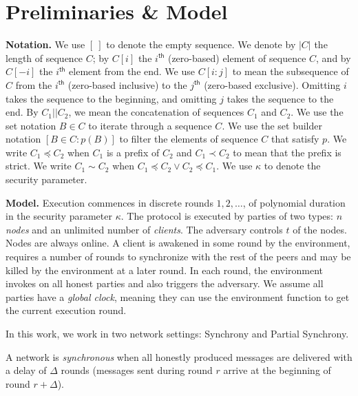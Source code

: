 \section{Preliminaries \& Model}\label{sec:prelims}

\noindent
\textbf{Notation.}
We use $[~]$ to denote the empty sequence.
We denote by $|C|$ the length of sequence $C$;
by $C[i]$ the $i^{\textsf{th}}$ (zero-based) element of
sequence $C$, and by $C[-i]$ the $i^{\textsf{th}}$ element
from the end. We use $C[i{:}j]$ to mean the subsequence
of $C$ from the $i^{\textsf{th}}$ (zero-based inclusive)
to the $j^{\textsf{th}}$ (zero-based exclusive).
Omitting $i$ takes the sequence to the beginning,
and omitting $j$ takes the sequence to the end.
By $C_1 || C_2$, we mean the concatenation
of sequences $C_1$ and $C_2$.
We use the set notation $B \in C$ to iterate
through a sequence $C$.
We use the set builder notation $[B \in C: p(B)]$
to filter the elements of sequence $C$ that satisfy $p$.
We write $C_1 \preccurlyeq C_2$ when $C_1$ is a prefix
of $C_2$ and $C_1 \prec C_2$ to mean that the prefix is strict.
We write $C_1 \sim C_2$ when
$C_1 \preccurlyeq C_2 \lor C_2 \preccurlyeq C_1$.
We use $\kappa$ to denote the security parameter.

\noindent
\textbf{Model.}
Execution commences in discrete rounds $1, 2, \ldots$, of polynomial duration in the
security parameter $\kappa$.
The protocol is executed by
parties of two types: $n$ \emph{nodes} and an unlimited number of \emph{clients}.
The adversary controls $t$ of the nodes.
Nodes are always online. A client is awakened in some round by the environment,
requires a number of rounds to synchronize with the rest of the peers and may be killed by
the environment at a later round.
In each round, the environment invokes \execute
on all honest parties and also triggers the adversary.
We assume all parties have a \emph{global clock}, meaning
they can use the environment function \now to get the current
execution round.

In this work, we work in two network settings: Synchrony and Partial Synchrony.

\begin{definition}[Synchrony]
  A network is \emph{synchronous} when
  all honestly produced messages are delivered with a delay of $\Delta$ rounds
  (messages sent during round $r$ arrive at the beginning of round $r + \Delta$).
\end{definition}

